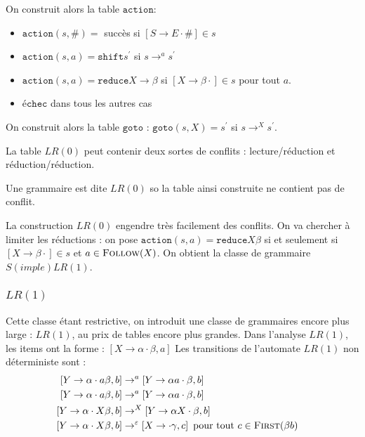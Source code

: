 \documentclass{cours}
\begin{document}
On construit alors la table $\texttt{action}$:
\begin{itemize}
    \item $\texttt{action}(s, \#) = $ succès si $\left[S \rightarrow E \cdot \#\right] \in s$
    \item $\texttt{action}(s, a) = \texttt{shift} s^{'}$ si $s\rightarrow^{a} s^{'}$
    \item $\texttt{action}(s, a) = \texttt{reduce} X \rightarrow \beta$ si $\left[X \rightarrow \beta\cdot \right] \in s$ pour tout $a$.
    \item $\texttt{échec}$ dans tous les autres cas
\end{itemize}

On construit alors la table $\texttt{goto}$ : $\texttt{goto}(s, X) = s^{'}$ si $s \rightarrow^{X} s^{'}$.

La table $LR(0)$ peut contenir deux sortes de conflits : lecture/réduction et réduction/réduction.
\begin{definition}
    Une grammaire est dite $LR(0)$ so la table ainsi construite ne contient pas de conflit.
\end{definition}
La construction $LR(0)$ engendre très facilement des conflits. On va chercher à limiter les réductions : 
on pose $\texttt{action}(s, a) = \texttt{reduce} X \beta$ si et seulement si $\left[X \rightarrow \beta\cdot\right] \in s$ et $a \in \textsc{Follow}(X)$. On obtient la classe de grammaire $S(imple)LR(1)$.

\subsubsection{$LR(1)$}
Cette classe étant restrictive, on introduit une classe de grammaires encore plus large : $LR(1)$, au prix de tables encore plus grandes. Dans l'analyse $LR(1)$, les items ont la forme : $\left[X \rightarrow \alpha \cdot \beta, a\right]$
Les transitions de l'automate $LR(1)$ non déterministe sont : 
\begin{equation*}
    \begin{aligned}
        \left[Y \rightarrow \alpha \cdot a\beta, b\right] &\rightarrow^{a} \left[Y \rightarrow \alpha a \cdot \beta, b\right]&\\\left[Y \rightarrow \alpha \cdot a\beta, b\right] &\rightarrow^{a} \left[Y \rightarrow \alpha a \cdot \beta, b\right]&\\
        \left[Y \rightarrow \alpha \cdot X\beta, b\right] &\rightarrow^{X} \left[Y \rightarrow \alpha X \cdot \beta, b\right]&\\
        \left[Y \rightarrow \alpha \cdot X\beta, b\right] &\rightarrow^{\epsilon} \left[X \rightarrow \cdot\gamma, c\right] \text{ pour tout } c \in \textsc{First}(\beta b)&
    \end{aligned}
\end{equation*}
\end{document}
